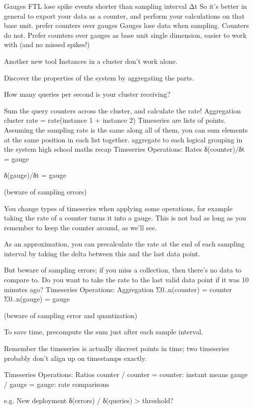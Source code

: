 \documentclass[online,12pt,helvetica]{chaksem}
\begin{document}
Gauges FTL
lose spike events shorter than sampling interval
Δt
So it's better in general to export your data as a counter, and perform your calculations on that base unit.
prefer counters over gauges
Gauges lose data when sampling.
Counters do not.
Prefer counters over gauges as base unit single dimension, easier to work with (and no missed spikes!)

Another new tool
Instances in a cluster don't work alone.

Discover the properties of the system by aggregating the parts.

How many queries per second is your cluster receiving?

Sum the query counters across the cluster, and calculate the rate!
Aggregation
cluster rate = rate(instance 1 + instance 2)
Timeseries are lists of points.  Assuming the sampling rate is the same along all of them, you can sum elements at the same position in each list together.  
aggregate to each logical grouping in the system
high school maths recap
Timeseries Operations: Rates
δ(counter)/δt = gauge

δ(gauge)/δt = gauge

(beware of sampling errors)

You change types of timeseries when applying some operations, for example taking the rate of a counter turns it into a gauge.  This is not bad as long as you remember to keep the counter around, as we'll see.

As an approximation, you can precalculate the rate at the end of each sampling interval by taking the delta between this and the last data point.

But beware of sampling errors; if you miss a collection, then there's no data to compare to.  Do you want to take the rate to the last valid data point if it was 10 minutes ago?
Timeseries Operations: Aggregation
Σ0..n(counter) = counter
Σ0..n(gauge) = gauge


(beware of sampling error and quantization)

To save time, precompute the sum just after each sample interval.

Remember the timeseries is actually discreet points in time; two timeseries probably don't align up on timestamps exactly.

Timeseries Operations: Ratios
counter / counter = counter: instant means
gauge / gauge = gauge: rate comparisons

e.g. New deployment
δ(errors) / δ(queries) > threshold?
\end{document}
